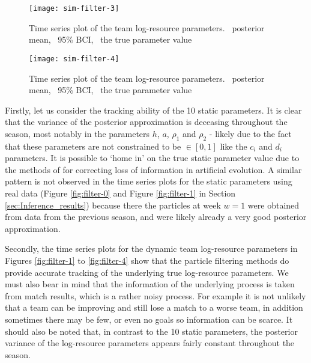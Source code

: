 %
\begin{figure}[htp]
\begin{center}
\texttt{[image: sim-filter-3]}
\caption{Time series plot of the team log-resource parameters. \protect\redSolidLine\ posterior mean,
\protect\blackDashedLine\ 95\% BCI, \protect\greenSolidLine\ the true parameter value}
\end{center}
\end{figure}
%
\begin{figure}[htp]
\begin{center}
\texttt{[image: sim-filter-4]}
\caption{Time series plot of the team log-resource parameters. \protect\redSolidLine\ posterior mean,
\protect\blackDashedLine\ 95\% BCI, \protect\greenSolidLine\ the true parameter value}
\label{fig:sim-filter-4}
\end{center}
\end{figure}

Firstly, let us consider the tracking ability of the 10 static parameters. It is clear that the variance of the
posterior approximation is deceasing throughout the season, most notably in the parameters \(h\), \(a\), \(\rho_1\) and
\(\rho_2\) - likely due to the fact that these parameters are not constrained to be \(\in [0, 1]\) like the \(c_i\) and
\(d_i\) parameters. It is possible to `home in' on the true static parameter value due to the methods of \cite{liu2001}
for correcting loss of information in artificial evolution. A similar pattern is not observed in the time series plots
for the static parameters using real data (Figure \ref{fig:filter-0} and Figure \ref{fig:filter-1} in Section
\ref{sec:Inference_results}) because there the particles at week \(w = 1\) were obtained from data from the previous
season, and were likely already a very good posterior approximation. 

Secondly, the time series plots for the dynamic team log-resource parameters in Figures \ref{fig:filter-1} to
\ref{fig:filter-4} show that the particle filtering methods do provide accurate tracking of the underlying true
log-resource parameters. We must also bear in mind that the information of the underlying process is taken from match
results, which is a rather noisy process. For example it is not unlikely that a team can be improving and still lose a
match to a worse team, in addition sometimes there may be few, or even no goals so information can be scarce. It should
also be noted that, in contrast to the 10 static parameters, the posterior variance of the log-resource parameters
appears fairly constant throughout the season.

